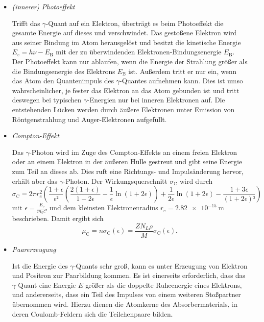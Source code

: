 \begin{itemize}
\item{\emph{(innerer) Photoeffekt}}

Trifft das $\gamma$-Quant auf ein Elektron, überträgt es beim Photoeffekt die gesamte Energie auf dieses und verschwindet. 
Das gestoßene Elektron wird aus seiner Bindung im Atom herausgelöst und besitzt die kinetische Energie $E_e=h\nu-E_\text{B}$ mit der zu überwindenden Elektronen-Bindungsenergie $E_\text{B}$. 
Der Photoeffekt kann nur ablaufen, wenn die Energie der Strahlung größer als die Bindungsenergie des Elektrons $E_\text{B}$ ist. 
Außerdem tritt er nur ein, wenn das Atom den Quantenimpuls des $\gamma$-Quantes aufnehmen kann. 
Dies ist umso wahrscheinlicher, je fester das Elektron an das Atom gebunden ist und tritt deswegen bei typischen $\gamma$-Energien nur bei inneren Elektronen auf. 
Die entstehenden Lücken werden durch äußere Elektronen unter Emission von Röntgenstrahlung und Auger-Elektronen aufgefüllt.
\item{\emph{Compton-Effekt}}

Das $\gamma$-Photon wird im Zuge des Compton-Effekts an einem freien Elektron oder an einem Elektron in der äußeren Hülle gestreut und gibt seine Energie zum Teil an dieses ab. 
Dies ruft eine Richtungs- und Impulsänderung hervor, erhält aber das $\gamma$-Photon.
Der Wirkungsquerschnitt $\sigma_\text{C}$ wird durch
\begin{equation}
	\sigma_\text{C}=2\pi  r_e^2\left(\frac{1+\epsilon}{\epsilon²}\left(\frac{2(1+\epsilon)}{1+2\epsilon}-\frac{1}{\epsilon}\ln(1+2\epsilon)\right)+\frac{1}{2\epsilon}\ln(1+2\epsilon)-\frac{1+3\epsilon}{(1+2\epsilon)²}\right)
\label{eq:sigma_c}
\end{equation}
mit $\epsilon=\frac{E_{\gamma}}{m_0c²}$ und dem kleinsten Elektronenradius $r_e=\SI{2.82e-15}{\meter}$ beschrieben. 
Damit ergibt sich
\begin{equation}
	\mu_\text{C}=n\sigma_\text{C}(\epsilon)=\frac{Z N_L \rho}{M}\sigma_\text{C}(\epsilon).
\label{eq:mu_c}
\end{equation}
\item{\emph{Paarerzeugung}}

Ist die Energie des $\gamma$-Quants sehr groß, kann es unter Erzeugung von Elektron und Positron zur Paarbildung kommen.
Es ist einerseits erforderlich, dass das $\gamma$-Quant eine Energie $E$ größer als die doppelte Ruheenergie eines Elektrons, und andererseits, dass ein Teil des Impulses von einem weiteren Stoßpartner übernommen wird.
Hierzu dienen die Atomkerne des Absorbermaterials, in  deren Coulomb-Feldern  sich die  Teilchenpaare bilden.
\end{itemize}
